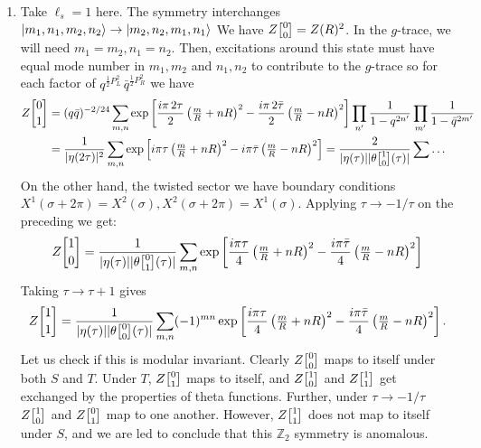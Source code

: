 \documentclass[11pt]{article}
\begin{document}
\begin{enumerate}
	
	\item Take $\ell_s = 1$ here. The symmetry interchanges $\ket{m_1, n_1, m_2, n_2} \to \ket{m_2, n_2, m_1, n_1}$ We have $Z\twist00 = Z(R)^2$. In the $g$-trace, we will need $m_1 = m_2, n_1 = n_2$. Then, excitations around this state must have equal mode number in $m_1, m_2$ and $n_1, n_2$ to contribute to the $g$-trace so for each factor of $q^{\frac12 P_L^2} \, \bar q^{\frac12 P_R^2}$ we have
	\[
	\begin{aligned}
		Z\twist01 &= (q \bar q)^{-2/24} \sum_{m, n} \exp\left[\frac{i \pi \, 2 \tau}{2} \left( \tfrac{m}{R} + n R \right)^2 -  \frac{i \pi \, 2 \bar \tau}{2}  \left( \tfrac{m}{R} - n R \right)^2  \right] \prod_{n'} \frac{1}{1-q^{2n'}} \prod_{m'} \frac1{1-\bar q^{2m'}}\\
		& = \frac{1}{|\eta(2 \tau)|^2}  \sum_{m, n} \exp\left[i \pi \tau \left( \tfrac{m}{R} + n R \right)^2 - i \pi \bar \tau \left( \tfrac{m}{R} - n R \right)^2  \right] = \frac{2}{|\eta(\tau)| |\theta\twist10(\tau)|} \sum \dots
	\end{aligned}
	\]
	On the other hand, the twisted sector we have boundary conditions $X^1(\sigma+2\pi) = X^2(\sigma), X^2(\sigma+2\pi) = X^1(\sigma)$. Applying $\tau \to -1/\tau$ on the preceding we get:
	\[
		Z\twist10 = \frac{1}{|\eta(\tau)| |\theta\twist01(\tau)|} \sum_{m, n}  \exp\left[\frac{i \pi \tau}{4} \left( \tfrac{m}{R} + n R \right)^2 - \frac{i \pi \bar \tau}{4} \left( \tfrac{m}{R} - n R \right)^2  \right] 
	\]
	Taking $\tau \to \tau+1$ gives
	\[
		Z\twist11 = \frac{1}{|\eta(\tau)| |\theta\twist00(\tau)|}\sum_{m, n} (-1)^{mn} \exp\left[\frac{i \pi \tau}{4} \left( \tfrac{m}{R} + n R \right)^2 - \frac{i \pi \bar \tau}{4} \left( \tfrac{m}{R} - n R \right)^2  \right].
	\]
	Let us check if this is modular invariant. Clearly $Z\twist00$ maps to itself under both $S$ and $T$. Under $T$, $Z\twist01$ maps to itself, and $Z\twist10$ and $Z\twist11$ get exchanged by the properties of theta functions. Further, under $\tau \to -1/\tau$ $Z\twist10$ and $Z\twist01$ map to one another. However, $Z\twist11$ does not map to itself under $S$, and we are led to conclude that this $\mathbb Z_2$ symmetry is anomalous. %
	

\end{enumerate}
\end{document}
